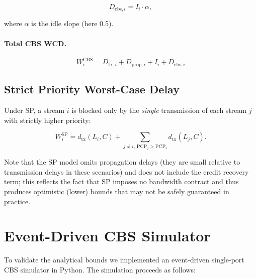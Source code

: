 \begin{equation}
    D_{\mathrm{cbs},i} = I_i \cdot \alpha,
    \label{eq:cbs_recovery}
\end{equation}

where $\alpha$ is the idle slope (here 0.5).

\paragraph{Total CBS WCD.}

\begin{equation}
    \boxed{W_i^{\mathrm{CBS}} = D_{\mathrm{tx},i} + D_{\mathrm{prop},i} + I_i + D_{\mathrm{cbs},i}}
    \label{eq:wcd_cbs}
\end{equation}

\subsection{Strict Priority Worst-Case Delay}

Under SP, a stream $i$ is blocked only by the \emph{single} transmission of each stream $j$ with strictly higher priority:

\begin{equation}
    W_i^{\mathrm{SP}} = d_{\mathrm{tx}}(L_i, C) + \sum_{j \neq i,\, \mathrm{PCP}_j > \mathrm{PCP}_i} d_{\mathrm{tx}}(L_j, C).
    \label{eq:wcd_sp}
\end{equation}

Note that the SP model omits propagation delays (they are small relative to transmission delays in these scenarios) and does not include the credit recovery term; this reflects the fact that SP imposes no bandwidth contract and thus produces optimistic (lower) bounds that may not be safely guaranteed in practice.

\section{Event-Driven CBS Simulator}
\label{sec:sim}

To validate the analytical bounds we implemented an event-driven single-port CBS simulator in Python. The simulation proceeds as follows:


